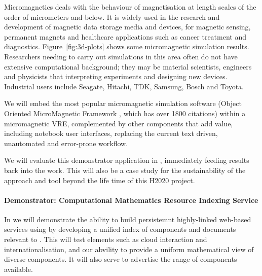 Micromagnetics deals with the behaviour of
magnetisation at length scales of the order of
micrometers and below. It is widely used in the research and
development of magnetic data storage media and devices, for magnetic
sensing, permanent magnets and healthcare applications such as cancer
treatment and diagnostics. Figure~\ref{fig:3d-plots} shows some micromagnetic simulation results.
Researchers needing to carry out simulations in this area often do not
have  extensive computational background; they may be
material scientists, engineers and physicists that
interpreting  experiments and designing new devices. Industrial users include Seagate, Hitachi,
TDK, Samsung, Bosch and Toyota.


We will embed the most popular micromagnetic
simulation software (Object Oriented MicroMagnetic Framework
\cite{OOMMF-url}, which has over 1800 citations) within a micromagnetic VRE, complemented by other
components that add value, including notebook user interfaces,
replacing the current text driven, unautomated and error-prone workflow.

We will evaluate this demonstrator application in 
, immediately feeding
results back into the \TheProject work. This will also
be a case study for the sustainability of the approach and tool beyond
the life time of this H2020 project.

\paragraph{Demonstrator: Computational Mathematics Resource Indexing
Service}

In  
we will demonstrate the ability to build persistemnt highly-linked
web-based services using \TheProject by developing a unified index of
components and documents relevant to \TheProject. This will test
elements such as cloud interaction and internationalisation, and our
abvility to provide a uniform mathematical view of diverse
components. It will also serve
to advertise the range of components available.

